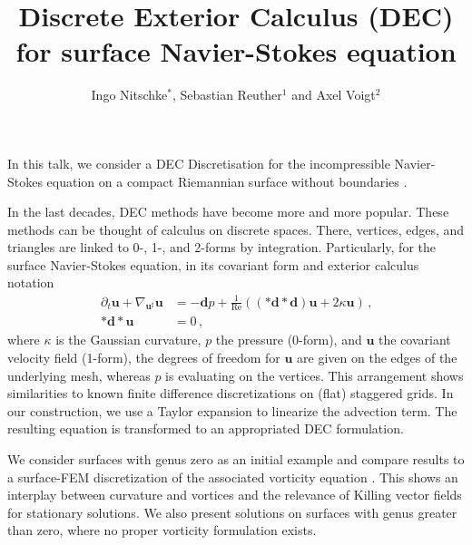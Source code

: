 \documentclass{xdms}
\title{Discrete Exterior Calculus (DEC) for surface Navier-Stokes equation}
\author{Ingo Nitschke$^{*}$, Sebastian Reuther$^{1}$ and Axel Voigt$^{2}$}
\newcommand{\ub}{\mathbf{u}} %
\newcommand{\exd}{\mathbf{d}} %
\newcommand{\gaussianCurvature}{\kappa} %
\newcommand{\formComma}{\,\text{,}}
\begin{document}
In this talk, we consider a DEC Discretisation for the incompressible Navier-Stokes equation on a compact Riemannian surface without boundaries \cite{Nitschkeetal_arXiv_2016}.

In the last decades, DEC methods \cite{Hirani_2003,Desbrunetal_arXiv_2005} have become more and more popular.
These methods can be thought of calculus on discrete spaces. 
There, vertices, edges, and triangles are linked to 0-, 1-, and 2-forms by integration.
Particularly, for the surface Navier-Stokes equation, in its covariant form \cite{ArroyoDeSimone_PRE_2009} and exterior calculus notation
\begin{align*}
	\partial_{t}\ub + \nabla_{\ub^{\sharp}}\ub &= - \exd p + \frac{1}{\text{Re}} \left( (*\exd * \exd) \ub + 2 \gaussianCurvature \ub \right) \formComma \\
	* \exd * \ub &= 0  \formComma
\end{align*}
where \( \gaussianCurvature \) is the Gaussian curvature, \( p \) the pressure (0-form), and \( \ub \) the covariant velocity field (1-form),
the degrees of freedom for \( \ub \) are given on the edges of the underlying mesh,
whereas \( p \) is evaluating on the vertices.
This arrangement shows similarities to known finite difference discretizations on (flat) staggered grids.
In our construction, we use a Taylor expansion to linearize the advection term. 
The resulting equation is transformed to an appropriated DEC formulation.

We consider surfaces with genus zero as an initial example and compare results to a surface-FEM discretization of the associated vorticity equation \cite{Reutheretal_MMS_2015}.
This shows an interplay between curvature and vortices and the relevance of Killing vector fields for stationary solutions.
We also present solutions on surfaces with genus greater than zero, where no proper vorticity formulation exists.
\end{document}
